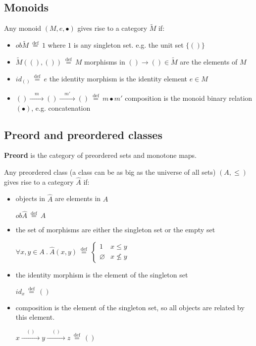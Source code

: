 \documentclass[../main.tex]{subfiles}
\begin{document}
\subsection{Monoids}
Any monoid $(M,e,\bullet)$ gives rise to a category $\tilde{M}$ if:
\begin{itemize}
  \item $\textit{ob}\tilde{M} ~\stackrel{\text{def}}{=}~ 1$ \qquad where $1$ is any singleton set. e.g. the unit set $\{()\}$
  \item $\tilde{M}( (), () ) ~\stackrel{\text{def}}{=}~ M$ \qquad morphisms in $() \rightarrow () \in \tilde{M}$ are the elements of $M$
  \item $id_{()} ~\stackrel{\text{def}}{=}~ e$ \qquad the identity morphism is the identity element $e \in M$
  \item $() \xrightarrow{\quad m \quad} () \xrightarrow{\quad m' \quad} () ~\stackrel{\text{def}}{=}~ m \bullet m'$ \qquad composition is the monoid binary relation $(\bullet)$, e.g. concatenation
\end{itemize}

\subsection{Preord and preordered classes}
\textbf{Preord} is the category of preordered sets and monotone maps. \par

Any preordered class (a class can be as big as the universe of all sets) $(A,\leq)$ gives rise to a category $\hat{A}$ if:
\begin{itemize}
  \item objects in $\hat{A}$ are elements in $A$ \par
    $\textit{ob}\hat{A} ~\stackrel{\text{def}}{=}~ A$
  \item the set of morphisms are either the singleton set or the empty set \par
    $\forall x,y \in A ~.~ \hat{A}(x,y) ~\stackrel{\text{def}}{=}~
    \begin{cases}
      1 & x \leq y \\
      \varnothing & x \nleq y
   \end{cases}$
  \item the identity morphism is the element of the singleton set \par $id_{x} ~\stackrel{\text{def}}{=}~ ()$
  \item composition is the element of the singleton set, so all objects are related by this element.\par
    $x \xrightarrow{\quad () \quad} y \xrightarrow{\quad () \quad} z ~\stackrel{\text{def}}{=}~ ()$
\end{itemize}
\end{document}
